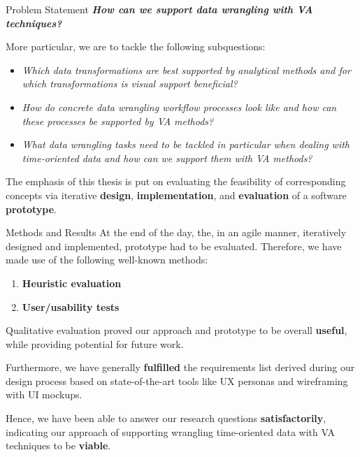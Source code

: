\documentclass[final,hyperref={pdfpagelabels=true}]{beamer}
\begin{document}
\begin{frame}
\begin{columns}[t]
\begin{column}{.45\textwidth}
\begin{block}{Problem Statement}
        \textbf{\emph{How can we support data wrangling with VA techniques?}}

        More particular, we are to tackle the following subquestions:

        \begin{itemize}
          \item \emph{Which data transformations are best supported by analytical methods and for which transformations is visual support beneficial?}
          \item \emph{How do concrete data wrangling workflow processes look like and how can these processes be supported by VA methods?}
          \item \emph{What data wrangling tasks need to be tackled in particular when dealing with time-oriented data and how can we support them with VA methods?}
        \end{itemize}

        The emphasis of this thesis is put on evaluating the feasibility of corresponding concepts via iterative \textbf{design}, \textbf{implementation}, and \textbf{evaluation} of a software \textbf{prototype}.
      \end{block}

      \begin{block}{Methods and Results}
        At the end of the day, the, in an agile manner, iteratively designed and implemented, prototype had to be evaluated.
        Therefore, we have made use of the following well-known methods:

        \begin{enumerate}
          \item \textbf{Heuristic evaluation}
          \item \textbf{User/usability tests}
        \end{enumerate}

        Qualitative evaluation proved our approach and prototype to be overall \textbf{useful}, while providing potential for future work.

        Furthermore, we have generally \textbf{fulfilled} the requirements list derived during our design process based on state-of-the-art tools like UX personas and wireframing with UI mockups.

        Hence, we have been able to answer our research questions \textbf{satisfactorily}, indicating our approach of supporting wrangling time-oriented data with VA techniques to be \textbf{viable}.
      \end{block}
    \end{column}


\end{columns}
\end{frame}
\end{document}
